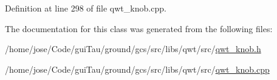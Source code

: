 Definition at line 298 of file qwt\-\_\-knob.\-cpp.



The documentation for this class was generated from the following files\-:\begin{DoxyCompactItemize}
\item 
/home/jose/\-Code/gui\-Tau/ground/gcs/src/libs/qwt/src/\hyperlink{qwt__knob_8h}{qwt\-\_\-knob.\-h}\item 
/home/jose/\-Code/gui\-Tau/ground/gcs/src/libs/qwt/src/\hyperlink{qwt__knob_8cpp}{qwt\-\_\-knob.\-cpp}\end{DoxyCompactItemize}
